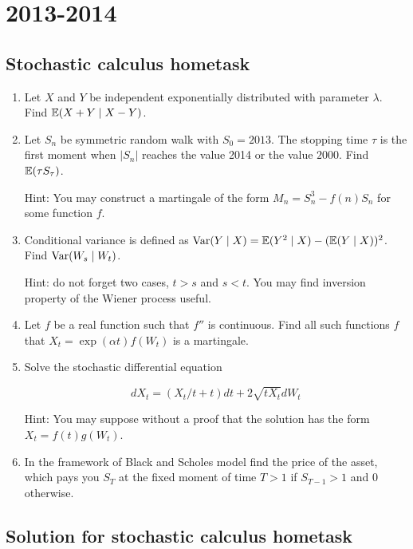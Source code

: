 \documentclass[pdftex,12pt,a4paper]{article}
\begin{document}
\section{2013-2014}

\subsection{Stochastic calculus hometask}

\begin{enumerate}

\item Let $X$ and $Y$ be independent exponentially distributed with parameter $\lambda$. Find $\mathbb{E}(X+Y \mid X-Y)$.

\item Let $S_n$ be symmetric random walk with $S_0=2013$. The stopping time $\tau$ is the first moment when $|S_n|$ reaches the value 2014 or the value $2000$. Find $\mathbb{E}(\tau S_{\tau})$.

Hint: You may construct a martingale of the form $M_n=S_n^3-f(n)S_n$ for some function $f$.

\item Conditional variance is defined as $\operatorname{Var}(Y \mid X)=\mathbb{E}(Y^2 \mid X) - (\mathbb{E}(Y \mid X) )^2$. Find $\operatorname{Var}(W_s \mid W_t)$. 

Hint: do not forget two cases, $t>s$ and $s<t$. You may find inversion property of the Wiener process useful.

\item Let $f$ be a real function such that $f''$ is continuous. Find all such functions $f$ that $X_t=\exp(\alpha t)f(W_t)$ is a martingale. 

\item Solve the stochastic differential equation 

\[
dX_t=(X_t/t+t)dt+2\sqrt{tX_t}dW_t
\]

Hint: You may suppose without a proof that the solution has the form $X_t=f(t)g(W_t)$. 

\item In the framework of Black and Scholes model find the price of the asset, which pays you $S_T$ at the fixed moment of time $T>1$ if $S_{T-1}>1$ and $0$ otherwise.
  

\end{enumerate}

\subsection{Solution for stochastic calculus hometask}
\end{document}
